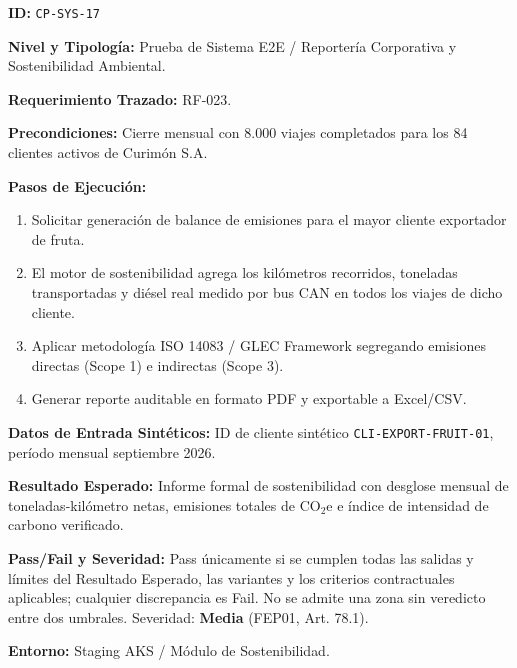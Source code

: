 \par\noindent\textbf{ID:} \texttt{C\allowbreak{}P\allowbreak{}-\allowbreak{}S\allowbreak{}Y\allowbreak{}S\allowbreak{}-\allowbreak{}1\allowbreak{}7\allowbreak{}}\par
\par\noindent\textbf{Nivel y Tipología:} Prueba de Sistema E2E / Reportería Corporativa y Sostenibilidad Ambiental.\par
\par\noindent\textbf{Requerimiento Trazado:} RF-023.\par
\par\noindent\textbf{Precondiciones:} Cierre mensual con 8.000 viajes completados para los 84 clientes activos de Curimón S.A.\par
\par\noindent\textbf{Pasos de Ejecución:} \par
\begin{enumerate}
\item Solicitar generación de balance de emisiones para el mayor cliente exportador de fruta.
\item El motor de sostenibilidad agrega los kilómetros recorridos, toneladas transportadas y diésel real medido por bus CAN en todos los viajes de dicho cliente.
\item Aplicar metodología ISO 14083 / GLEC Framework segregando emisiones directas (Scope 1) e indirectas (Scope 3).
\item Generar reporte auditable en formato PDF y exportable a Excel/CSV.
\end{enumerate}
\par\noindent\textbf{Datos de Entrada Sintéticos:} ID de cliente sintético \texttt{C\allowbreak{}L\allowbreak{}I\allowbreak{}-\allowbreak{}E\allowbreak{}X\allowbreak{}P\allowbreak{}O\allowbreak{}R\allowbreak{}T\allowbreak{}-\allowbreak{}F\allowbreak{}R\allowbreak{}U\allowbreak{}I\allowbreak{}T\allowbreak{}-\allowbreak{}0\allowbreak{}1\allowbreak{}}, período mensual septiembre 2026.\par
\par\noindent\textbf{Resultado Esperado:} Informe formal de sostenibilidad con desglose mensual de toneladas-kilómetro netas, emisiones totales de \(\text{CO}_2\text{e}\) e índice de intensidad de carbono verificado.\par
\par\noindent\textbf{Pass/Fail y Severidad:} Pass únicamente si se cumplen todas las salidas y límites del Resultado Esperado, las variantes y los criterios contractuales aplicables; cualquier discrepancia es Fail. No se admite una zona sin veredicto entre dos umbrales. Severidad: \textbf{Media} (FEP01, Art. 78.1).\par
\par\noindent\textbf{Entorno:} Staging AKS / Módulo de Sostenibilidad.\par







